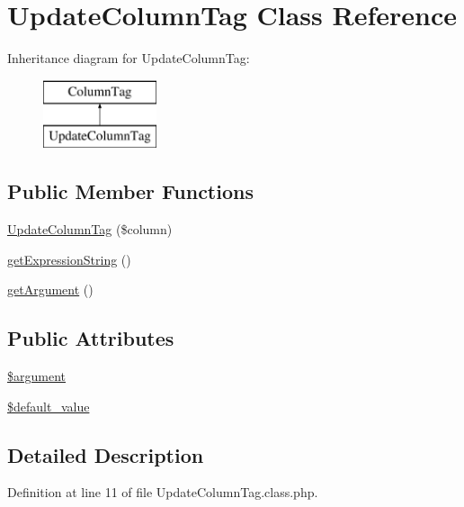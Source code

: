 \hypertarget{classUpdateColumnTag}{}\section{Update\+Column\+Tag Class Reference}
\label{classUpdateColumnTag}
Inheritance diagram for Update\+Column\+Tag\+:\begin{figure}[H]
\begin{center}
\leavevmode
\includegraphics[height=2.000000cm]{classUpdateColumnTag}
\end{center}
\end{figure}
\subsection*{Public Member Functions}
\begin{DoxyCompactItemize}
\item 
\hyperlink{classUpdateColumnTag_a08118f413b38890ca779e44974447854}{Update\+Column\+Tag} (\$column)
\item 
\hyperlink{classUpdateColumnTag_a16ab982f05143f8e0c4550f02ebe2357}{get\+Expression\+String} ()
\item 
\hyperlink{classUpdateColumnTag_a6b6cca5c598d435f3f40caf96f5dea4a}{get\+Argument} ()
\end{DoxyCompactItemize}
\subsection*{Public Attributes}
\begin{DoxyCompactItemize}
\item 
\hyperlink{classUpdateColumnTag_a3312163ccabc7246e2f397390648b75b}{\$argument}
\item 
\hyperlink{classUpdateColumnTag_a63420aa5c0b8c374a4f29d054abbda76}{\$default\+\_\+value}
\end{DoxyCompactItemize}


\subsection{Detailed Description}


Definition at line 11 of file Update\+Column\+Tag.\+class.\+php.



